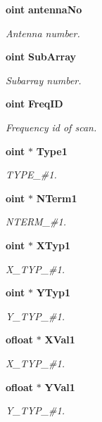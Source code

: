 \begin{CompactItemize}
{\bf oint} {\bf antenna\-No}
\begin{CompactList}\small\item\em Antenna number. \item\end{CompactList}\item 
{\bf oint} {\bf Sub\-Array}
\begin{CompactList}\small\item\em Subarray number. \item\end{CompactList}\item 
{\bf oint} {\bf Freq\-ID}
\begin{CompactList}\small\item\em Frequency id of scan. \item\end{CompactList}\item 
{\bf oint} $\ast$ {\bf Type1}
\begin{CompactList}\small\item\em TYPE\_\-\#1. \item\end{CompactList}\item 
{\bf oint} $\ast$ {\bf NTerm1}
\begin{CompactList}\small\item\em NTERM\_\-\#1. \item\end{CompactList}\item 
{\bf oint} $\ast$ {\bf XTyp1}
\begin{CompactList}\small\item\em X\_\-TYP\_\-\#1. \item\end{CompactList}\item 
{\bf oint} $\ast$ {\bf YTyp1}
\begin{CompactList}\small\item\em Y\_\-TYP\_\-\#1. \item\end{CompactList}\item 
{\bf ofloat} $\ast$ {\bf XVal1}
\begin{CompactList}\small\item\em X\_\-TYP\_\-\#1. \item\end{CompactList}\item 
{\bf ofloat} $\ast$ {\bf YVal1}
\begin{CompactList}\small\item\em Y\_\-TYP\_\-\#1. \item\end{CompactList}\item 

\end{CompactItemize}
